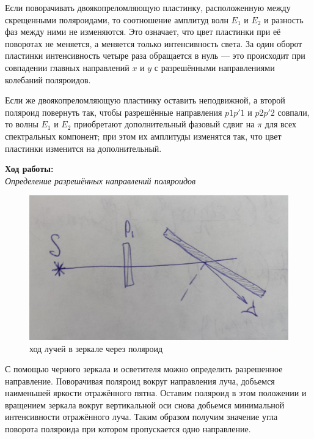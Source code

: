 \documentclass[a4paper, 12pt]{article}%
\begin{document}
	Если поворачивать двоякопреломляющую пластинку, расположенную между
	скрещенными поляроидами, то соотношение амплитуд волн $ E_1 $ и $ E_2 $ и разность фаз между ними не изменяются. Это означает, что цвет пластинки при её поворотах не меняется, а меняется только интенсивность света. За один оборот пластинки интенсивность четыре раза обращается в нуль --- это происходит при совпадении главных направлений
	$ x $ и $ y $ с разрешёнными направлениями колебаний поляроидов.
	
	Если же двоякопреломляющую пластинку оставить неподвижной, а
	второй поляроид повернуть так, чтобы разрешённые направления $ p1p'1 $
	и $ p2p'2 $ совпали, то волны $ E_1 $ и $ E_2 $ приобретают дополнительный фазовый сдвиг на $ \pi $ для всех спектральных компонент; при этом их амплитуды изменятся так, что цвет пластинки изменится на дополнительный. \\
	\newpage
	
	\textbf{Ход работы: }\\
	
	\textit{Определение разрешённых направлений поляроидов}\\
	\begin{figure}
		\includegraphics[width=\linewidth]{first}
		\caption{ход лучей в зеркале через поляроид}
	\end{figure}
	
	С помощью черного зеркала и осветителя можно определить разрешенное направление. Поворачивая поляроид вокруг направления луча, добьемся наименьшей яркости отражённого пятна. Оставим поляроид в этом положении и вращением зеркала вокруг вертикальной оси снова добьемся минимальной интенсивности отражённого луча. Таким образом получим значение угла поворота поляроида при котором пропускается одно направление.\\
	
\end{document}
